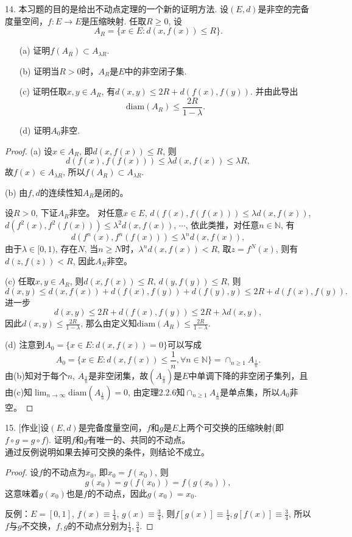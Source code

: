 \documentclass[a4paper,8pt]{ctexart}\textwidth 140mm \textheight 216mm
\newcommand{\8}{\infty}
\begin{document}
14. 本习题的目的是给出不动点定理的一个新的证明方法. 设$(E,d)$是非空的完备度量空间，$f:E\to E$是压缩映射. 任取$R\geq 0$, 设
$$A_R=\{x\in E:d(x,f(x))\leq R\}.$$
\begin{enumerate}
	\item[(a)] 证明$f(A_R)\subset A_{\lambda R}$.
	\item[(b)] 证明当$R>0$时，$A_R$是$E$中的非空闭子集.
	\item[(c)] 证明任取$x,y\in A_R$, 有$d(x,y)\leq 2R+d(f(x),f(y))$. 并由此导出
	$$\mathrm{diam}(A_R)\leq \frac{2R}{1-\lambda}.$$
	\item[(d)] 证明$A_0$非空.
\end{enumerate}
\begin{proof}
	(a) 设$x\in A_R$, 即$d(x,f(x))\leq R$, 则
	$$d(f(x),f(f(x)))\leq \lambda d(x,f(x))\leq \lambda R,$$
	故$f(x)\in A_{\lambda R}$, 所以$f(A_R)\subset A_{\lambda R}$.
	
	(b) 由$f,d$的连续性知$A_R$是闭的。
	
	设$R>0$, 下证$A_R$非空。 对任意$x\in E$, $d(f(x),f(f(x)))\leq \lambda d(x,f(x))$, $d(f^2(x),f^2(f(x)))\leq \lambda^2d(x,f(x))$, $\cdots$, 依此类推，对任意$n\in\mathbb{N}$, 有
	$$d(f^n(x),f^n(f(x)))\leq \lambda^n d(x,f(x)),$$
	由于$\lambda\in[0,1)$, 存在$N$, 当$n\geq N$时，$\lambda^n d(x,f(x))<R$, 取$z=f^N(x)$, 则有$d(z,f(z))<R$, 因此$A_R$非空。
	
	(c) 任取$x,y\in A_R$, 则$d(x,f(x))\leq R$, $d(y,f(y))\leq R$, 则
	$$d(x,y)\leq d(x,f(x))+d(f(x),f(y))+d(f(y),y)\leq 2R+d(f(x),f(y)).$$
	进一步
	$$d(x,y)\leq 2R+d(f(x),f(y))\leq 2R+\lambda d(x,y),$$
	因此$d(x,y)\leq \frac{2R}{1-\lambda}$, 那么由定义知$\mathrm{diam}(A_R)\leq \frac{2R}{1-\lambda}$.
	
	(d) 注意到$A_0=\{x\in E:d(x,f(x))=0\}$可以写成
	$$A_0=\{x\in　E:d(x,f(x))\leq \frac{1}{n},\forall n\in \mathbb{N}\}=\cap_{n\geq 1}A_{\frac{1}{n}}.$$
	由(b)知对于每个$n$, $A_{\frac{1}{n}}$是非空闭集，故$(A_{\frac{1}{n}})$是$E$中单调下降的非空闭子集列，且由(c)知$\lim_{n\to\infty}\mathrm{diam}(A_{\frac{1}{n}})=0$, 由定理2.2.6知$\cap_{n\geq 1}A_{\frac{1}{n}}$是单点集，所以$A_0$非空。
\end{proof}

15. [作业]设$(E,d)$是完备度量空间，$f$和$g$是$E$上两个可交换的压缩映射(即$f\circ g=g\circ f$). 证明$f$和$g$有唯一的、共同的不动点。\\
通过反例说明如果去掉可交换的条件，则结论不成立。
\begin{proof}
	设$f$的不动点为$x_0$, 即$x_0=f(x_0)$, 则
	$$g(x_0)=g(f(x_0))=f(g(x_0)),$$
	这意味着$g(x_0)$也是$f$的不动点，因此$g(x_0)=x_0$. 
	
	反例：$E=[0,1]$, $f(x)\equiv\frac{1}{4}$, $g(x)\equiv\frac{3}{4}$, 则$f[g(x)]\equiv \frac{1}{4},g[f(x)]\equiv\frac{3}{4}$, 所以$f$与$g$不交换，$f,g$的不动点分别为$\frac{1}{4},\frac{3}{4}$.
\end{proof}
\clearpage
\end{document}
